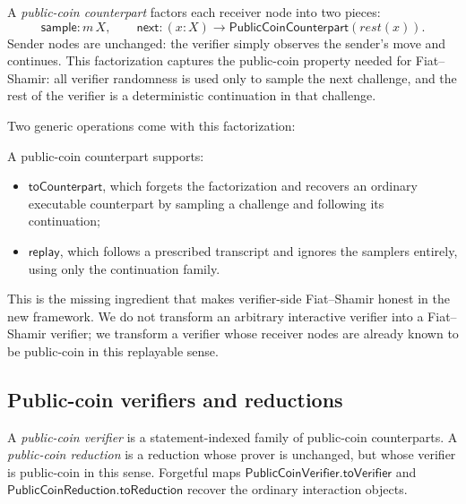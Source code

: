 \begin{definition}[PublicCoinCounterpart]
  \label{int:public-coin-counterpart}
  A \emph{public-coin counterpart} factors each receiver node into two pieces:
  \[
    \mathsf{sample} : m\,X,
    \qquad
    \mathsf{next} : (x : X) \to \mathsf{PublicCoinCounterpart}(\mathit{rest}(x)).
  \]
  Sender nodes are unchanged: the verifier simply observes the sender's move
  and continues.  This factorization captures the public-coin property needed
  for Fiat--Shamir: all verifier randomness is used only to sample the next
  challenge, and the rest of the verifier is a deterministic continuation in
  that challenge.
\end{definition}

Two generic operations come with this factorization:

\begin{definition}
  \label{int:public-coin-replay}
  A public-coin counterpart supports:
  \begin{itemize}
    \item $\mathsf{toCounterpart}$, which forgets the factorization and
      recovers an ordinary executable counterpart by sampling a challenge and
      following its continuation;
    \item $\mathsf{replay}$, which follows a prescribed transcript and ignores
      the samplers entirely, using only the continuation family.
  \end{itemize}
\end{definition}

This is the missing ingredient that makes verifier-side Fiat--Shamir honest in
the new framework.  We do not transform an arbitrary interactive verifier into
a Fiat--Shamir verifier; we transform a verifier whose receiver nodes are
already known to be public-coin in this replayable sense.

\subsection{Public-coin verifiers and reductions}

\begin{definition}
  \label{int:public-coin-verifier-reduction}
  A \emph{public-coin verifier} is a statement-indexed family of public-coin
  counterparts.  A \emph{public-coin reduction} is a reduction whose prover is
  unchanged, but whose verifier is public-coin in this sense.
  Forgetful maps
  $\mathsf{PublicCoinVerifier.toVerifier}$ and
  $\mathsf{PublicCoinReduction.toReduction}$ recover the ordinary interaction
  objects.
\end{definition}

